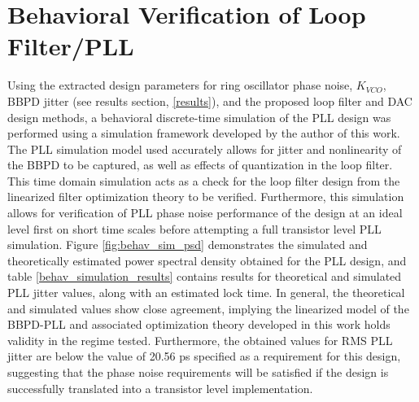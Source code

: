 
	\FloatBarrier

	\section{Behavioral Verification of Loop Filter/PLL}\label{behav_sim}

		Using the extracted design parameters for ring oscillator phase noise, $K_{VCO}$, BBPD jitter (see results section, \ref{results}), and the proposed loop filter and DAC design methods, a behavioral discrete-time simulation of the PLL design was performed using a simulation framework \cite{Me} developed by the author of this work. The PLL simulation model used accurately allows for jitter and nonlinearity of the BBPD to be captured, as well as effects of quantization in the loop filter.  This time domain simulation acts as a check for the loop filter design from the linearized filter optimization theory to be verified. Furthermore, this simulation allows for verification of PLL phase noise performance of the design at an ideal level first on short time scales before attempting a full transistor level PLL simulation. Figure \ref{fig:behav_sim_psd} demonstrates the simulated and theoretically estimated power spectral density obtained for the PLL design, and table \ref{behav_simulation_results} contains results for theoretical and simulated PLL jitter values, along with an estimated lock time. In general, the theoretical and simulated values show close agreement, implying the linearized model of the BBPD-PLL and associated optimization theory developed in this work holds validity in the regime tested. Furthermore, the obtained values for RMS PLL jitter are below the value of 20.56 ps specified as a requirement for this design, suggesting that the phase noise requirements will be satisfied if the design is successfully translated into a transistor level implementation.



